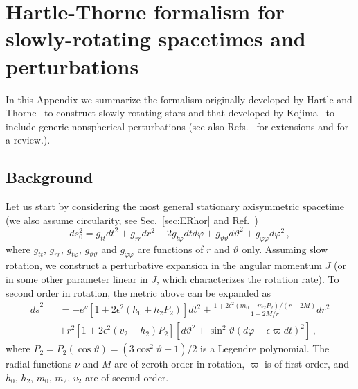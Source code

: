 \documentclass[11pt]{article}
\newcommand{\nn}{\nonumber}
\def\th{\vartheta}
\numberwithin{equation}{section} %
\begin{document}
\section{Hartle-Thorne formalism for slowly-rotating spacetimes and perturbations}\label{app:HT}
In this Appendix we summarize the formalism originally developed by Hartle and Thorne~\cite{Hartle:1967he} to construct slowly-rotating stars and that developed by Kojima~\cite{Kojima:1992ie,1993ApJ...414..247K} to include generic nonspherical perturbations (see also Refs.~\cite{Pani:2012bp,Brito:2013wya} for extensions and \cite{Pani:2013pma} for a review.). 
\subsection{Background} 
Let us start by considering the most general stationary axisymmetric spacetime (we also assume circularity, see Sec.~\ref{sec:ERhor} and Ref.~\cite{Chandra}) 
\begin{equation}
 ds^2_0=g_{tt}dt^2+g_{rr}dr^2+2g_{t\varphi}dtd\varphi+g_{\th\th}d\vartheta^2+g_{\varphi\varphi}d\varphi^2\,,\label{genericspinningmetric}
\end{equation}
where $g_{tt}$, $g_{rr}$, $g_{t\varphi}$, $g_{\th\th}$ and $g_{\varphi\varphi}$ are functions of $r$ and $\vartheta$ only. Assuming slow rotation, we construct a perturbative expansion in the angular momentum $J$ (or in some other parameter linear in $J$, which characterizes the rotation rate). To second order in rotation, the metric above can be expanded as~\cite{Hartle:1967he}
\begin{eqnarray}
 d\tilde{s}^2&&=-e^\nu\left[1+2\epsilon^2\left(h_0+h_2 P_2\right)\right]dt^2+\frac{1+2\epsilon^2(m_0+m_2P_2)/(r-2M)}{1-2M/r}dr^2\nn\\
 &&+r^2\left[1+2\epsilon^2(v_2-h_2)P_2\right]\left[d\vartheta^2+\sin^2\vartheta(d\varphi-\epsilon\varpi dt)^2\right]\,, \label{metricHT2b}
\end{eqnarray}
where $P_2=P_2(\cos\vartheta)=(3\cos^2\vartheta-1)/2$ is a Legendre
polynomial. The radial functions $\nu$ and $M$ are of zeroth order in
rotation, $\varpi$ is of first order, and $h_0$, $h_2$,
$m_0$, $m_2$, $v_2$ are of second order. 
\end{document}
